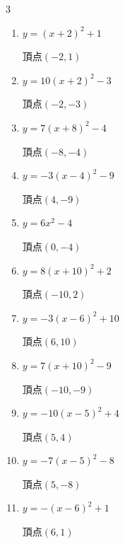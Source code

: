 \begin{multicols}{3}
\begin{enumerate}
        $\displaystyle 頂点\left( -7 , 10 \right)$

  \item $\displaystyle y=\left( x+2\right)^{2}+1$

        $\displaystyle 頂点\left( -2 , 1 \right)$

  \item $\displaystyle y=10\left( x+2\right)^{2}-3$

        $\displaystyle 頂点\left( -2 , -3 \right)$

  \item $\displaystyle y=7\left( x+8\right)^{2}-4$

        $\displaystyle 頂点\left( -8 , -4 \right)$

  \item $\displaystyle y=-3\left( x-4\right)^{2}-9$

        $\displaystyle 頂点\left( 4 , -9 \right)$

\columnbreak %

\resetques

  \item $\displaystyle y=6x^{2}-4$

        $\displaystyle 頂点\left( 0 , -4 \right)$

  \item $\displaystyle y=8\left( x+10\right)^{2}+2$

        $\displaystyle 頂点\left( -10 , 2 \right)$

  \item $\displaystyle y=-3\left( x-6\right)^{2}+10$

        $\displaystyle 頂点\left( 6 , 10 \right)$

  \item $\displaystyle y=7\left( x+10\right)^{2}-9$

        $\displaystyle 頂点\left( -10 , -9 \right)$

  \item $\displaystyle y=-10\left( x-5\right)^{2}+4$

        $\displaystyle 頂点\left( 5 , 4 \right)$

  \item $\displaystyle y=-7\left( x-5\right)^{2}-8$

        $\displaystyle 頂点\left( 5 , -8 \right)$

  \item $\displaystyle y=-\left( x-6\right)^{2}+1$

        $\displaystyle 頂点\left( 6 , 1 \right)$


\end{enumerate}
\end{multicols}

